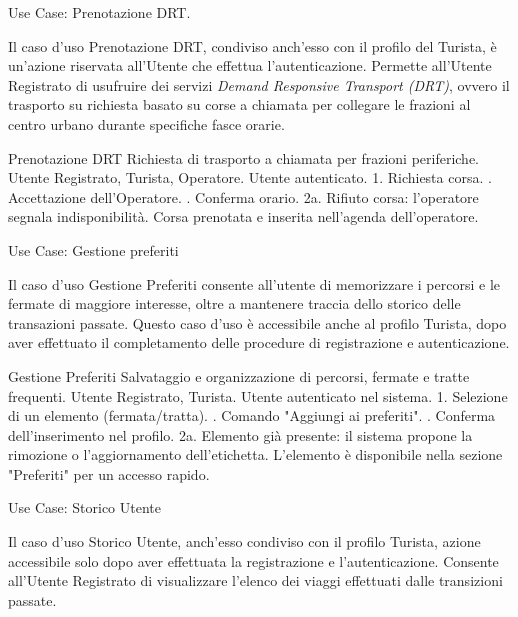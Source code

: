 \begin{center}
    Use Case: Prenotazione DRT.
\end{center}
Il caso d'uso Prenotazione DRT, condiviso anch'esso con il profilo del Turista, è un'azione riservata all'Utente che effettua l'autenticazione. Permette all'Utente Registrato di usufruire dei servizi \textit{Demand Responsive Transport (DRT)}, ovvero il trasporto su richiesta basato su corse a chiamata per collegare le frazioni al centro urbano durante specifiche fasce orarie. 

\vspace{0.5cm}

\usecasetable
{Prenotazione DRT}
{Richiesta di trasporto a chiamata per frazioni periferiche.}
{Utente Registrato, Turista, Operatore.}
{Utente autenticato.}
{1. Richiesta corsa. . Accettazione dell'Operatore. . Conferma orario.}
{2a. Rifiuto corsa: l'operatore segnala indisponibilità.}
{Corsa prenotata e inserita nell'agenda dell'operatore.}
\newpage

\begin{center}
    Use Case: Gestione preferiti
\end{center}
Il caso d'uso Gestione Preferiti consente all'utente di memorizzare i percorsi e le fermate di maggiore interesse, oltre a mantenere traccia dello storico delle transazioni passate. Questo caso d'uso è accessibile anche al profilo Turista, dopo aver effettuato il completamento delle procedure di registrazione e autenticazione.

\vspace{0.5cm}

\usecasetable
{Gestione Preferiti}
{Salvataggio e organizzazione di percorsi, fermate e tratte frequenti.}
{Utente Registrato, Turista.}
{Utente autenticato nel sistema.}
{1. Selezione di un elemento (fermata/tratta). . Comando "Aggiungi ai preferiti". . Conferma dell'inserimento nel profilo.}
{2a. Elemento già presente: il sistema propone la rimozione o l'aggiornamento dell'etichetta.}
{L'elemento è disponibile nella sezione "Preferiti" per un accesso rapido.}

\begin{center}
    Use Case: Storico Utente
\end{center}
Il caso d'uso Storico Utente, anch'esso condiviso con il profilo Turista, azione accessibile solo dopo aver effettuata la registrazione e l'autenticazione. Consente all'Utente Registrato di visualizzare l'elenco dei viaggi effettuati dalle transizioni passate. 

